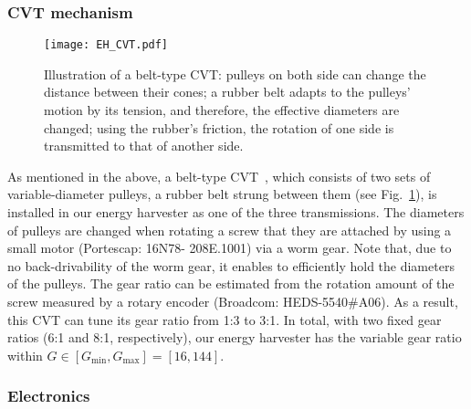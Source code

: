 \documentclass[twocolumn]{svjour3}          %
\begin{document}
\subsubsection{CVT mechanism}

\begin{figure}[tb]
    \centering
    \texttt{[image: EH\_CVT.pdf]}
    \caption{Illustration of a belt-type CVT:
    pulleys on both side can change the distance between their cones;
    a rubber belt adapts to the pulleys' motion by its tension, and therefore, the effective diameters are changed;
    using the rubber's friction, the rotation of one side is transmitted to that of another side.
    }
    \label{fig:EH_CVT}
\end{figure}

As mentioned in the above, a belt-type CVT~\cite{srivastava2009review}, which consists of two sets of variable-diameter pulleys, a rubber belt strung between them (see Fig.~\ref{fig:EH_CVT}), is installed in our energy harvester as one of the three transmissions.
The diameters of pulleys are changed when rotating a screw that they are attached by using a small motor (Portescap: 16N78- 208E.1001) via a worm gear.
Note that, due to no back-drivability of the worm gear, it enables to efficiently hold the diameters of the pulleys.
The gear ratio can be estimated from the rotation amount of the screw measured by a rotary encoder (Broadcom: HEDS-5540\#A06).
As a result, this CVT can tune its gear ratio from 1:3 to 3:1.
In total, with two fixed gear ratios (6:1 and 8:1, respectively), our energy harvester has the variable gear ratio within $G \in [G_\mathrm{min}, G_\mathrm{max}] = [16, 144]$.

\subsubsection{Electronics}
\end{document}
